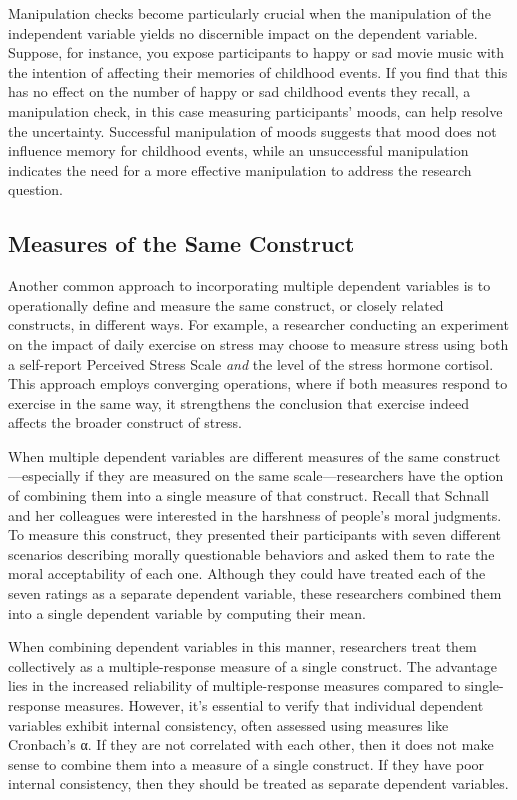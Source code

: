 \documentclass[
]{krantz}
\begin{document}
Manipulation checks become particularly crucial when the manipulation of the independent variable yields no discernible impact on the dependent variable. Suppose, for instance, you expose participants to happy or sad movie music with the intention of affecting their memories of childhood events. If you find that this has no effect on the number of happy or sad childhood events they recall, a manipulation check, in this case measuring participants' moods, can help resolve the uncertainty. Successful manipulation of moods suggests that mood does not influence memory for childhood events, while an unsuccessful manipulation indicates the need for a more effective manipulation to address the research question.

\subsection*{Measures of the Same Construct}\label{measures-of-the-same-construct}


Another common approach to incorporating multiple dependent variables is to operationally define and measure the same construct, or closely related constructs, in different ways. For example, a researcher conducting an experiment on the impact of daily exercise on stress may choose to measure stress using both a self-report Perceived Stress Scale \emph{and} the level of the stress hormone cortisol. This approach employs converging operations, where if both measures respond to exercise in the same way, it strengthens the conclusion that exercise indeed affects the broader construct of stress.

When multiple dependent variables are different measures of the same construct---especially if they are measured on the same scale---researchers have the option of combining them into a single measure of that construct. Recall that Schnall and her colleagues were interested in the harshness of people's moral judgments. To measure this construct, they presented their participants with seven different scenarios describing morally questionable behaviors and asked them to rate the moral acceptability of each one. Although they could have treated each of the seven ratings as a separate dependent variable, these researchers combined them into a single dependent variable by computing their mean.

When combining dependent variables in this manner, researchers treat them collectively as a multiple-response measure of a single construct. The advantage lies in the increased reliability of multiple-response measures compared to single-response measures. However, it's essential to verify that individual dependent variables exhibit internal consistency, often assessed using measures like Cronbach's α. If they are not correlated with each other, then it does not make sense to combine them into a measure of a single construct. If they have poor internal consistency, then they should be treated as separate dependent variables.
\end{document}
